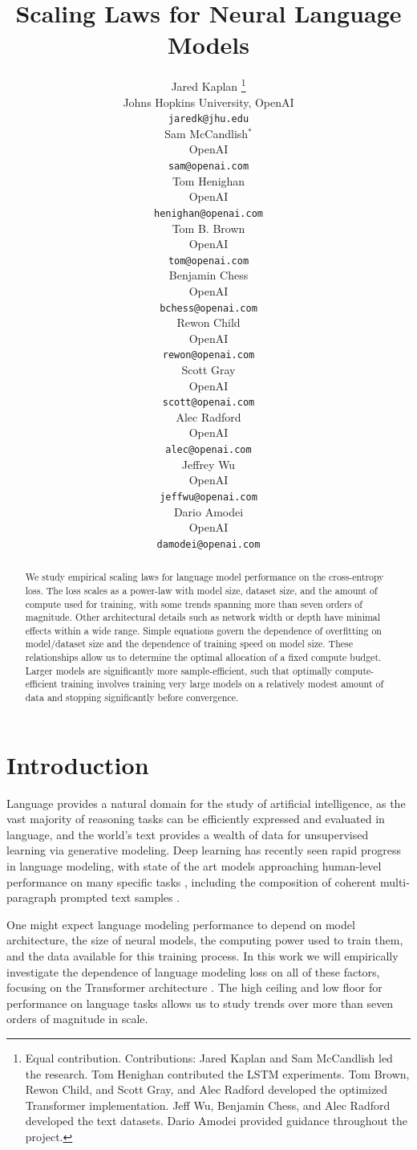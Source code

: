\documentclass[english]{article}
\title{Scaling Laws for Neural Language Models}
\author{
    Jared Kaplan \thanks{Equal contribution. \newline \newline
    Contributions: Jared Kaplan and Sam McCandlish led the research.  Tom Henighan contributed the LSTM experiments.  Tom Brown, Rewon Child, and Scott Gray, and Alec Radford developed the optimized Transformer implementation.  Jeff Wu, Benjamin Chess, and Alec Radford developed the text datasets.  Dario Amodei provided guidance throughout the project. \newline \newline
    }\\
    Johns Hopkins University, OpenAI \\
    \texttt{jaredk@jhu.edu} \\
\And
    Sam McCandlish$^{\ast}$\\
    OpenAI \\
    \texttt{sam@openai.com} \\
\AND
    Tom Henighan \\
    OpenAI \\
    \texttt{henighan@openai.com} \\
\And
    Tom B. Brown \\
    OpenAI \\
    \texttt{tom@openai.com} \\
\And
    Benjamin Chess\\
    OpenAI \\
    \texttt{bchess@openai.com} \\
\And
    Rewon Child\\
    OpenAI \\
    \texttt{rewon@openai.com} \\
\And
    Scott Gray\\
    OpenAI \\
    \texttt{scott@openai.com} \\
\And
    Alec Radford\\
    OpenAI \\
    \texttt{alec@openai.com} \\
\And
    Jeffrey Wu\\
    OpenAI \\
    \texttt{jeffwu@openai.com} \\
\And
    Dario Amodei \\
    OpenAI \\
    \texttt{damodei@openai.com} \\
}
\begin{document}
\maketitle

\begin{abstract}
We study empirical scaling laws for language model performance on the cross-entropy loss.
The loss scales as a power-law with model size, dataset size, and the amount of compute used for training, with some trends spanning more than seven orders of magnitude.
Other architectural details such as network width or depth have minimal effects within a wide range.
Simple equations govern the dependence of overfitting on model/dataset size and the dependence of training speed on model size.
These relationships allow us to determine the optimal allocation of a fixed compute budget.
Larger models are significantly more sample-efficient, such that optimally compute-efficient training involves training very large models on a relatively modest amount of data and stopping significantly before convergence.

\end{abstract}

\newpage\tableofcontents{}

\section{Introduction}


Language provides a natural domain for the study of artificial intelligence, as the vast majority of reasoning tasks can be efficiently expressed and evaluated in language, and the world's text provides a wealth of data for unsupervised learning via generative modeling.  Deep learning has recently seen rapid progress in language modeling, with state of the art models \cite{radford2018improving,1810.04805,1906.08237,DBLP:journals/corr/abs-1907-11692, 1910.10683} approaching human-level performance on many specific tasks \cite{wang2019superglue}, including the composition of coherent multi-paragraph prompted text samples \cite{radford2019language}.

One might expect language modeling performance to depend on model architecture, the size of neural models, the computing power used to train them, and the data available for this training process.  In this work we will empirically investigate the dependence of language modeling loss on all of these factors, focusing on the Transformer architecture \cite{OriginalTransformer,liu2018generating}.  The high ceiling and low floor for performance on language tasks allows us to study trends over more than seven orders of magnitude in scale.
\end{document}
